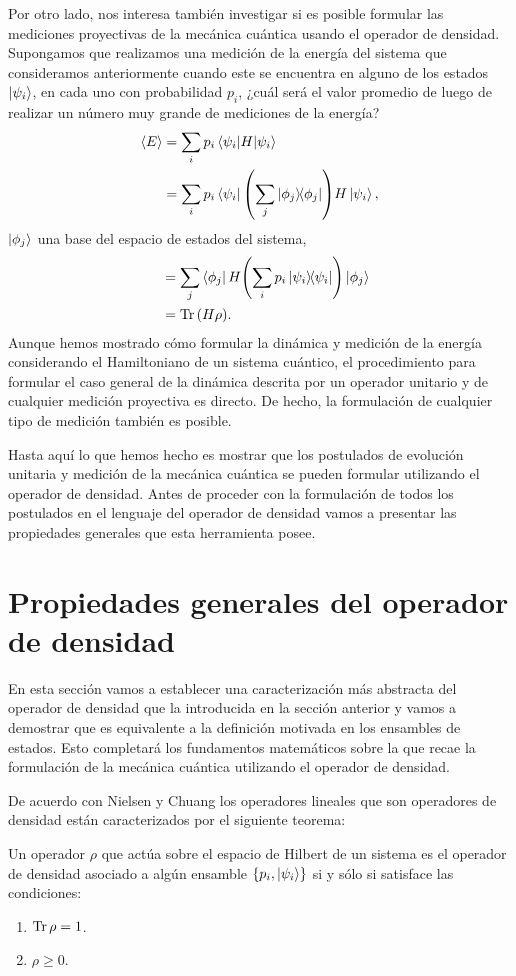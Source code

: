 Por otro lado, nos interesa también investigar si es posible formular
las mediciones proyectivas de la mecánica cuántica usando el operador de 
densidad. 
Supongamos que realizamos una medición de la energía del sistema que
consideramos anteriormente cuando este se encuentra en alguno de los 
estados $\ket{\psi_{i} }$, en cada uno con probabilidad $p_i$,
¿cuál será el valor promedio de luego de realizar un número
muy grande de mediciones de la energía?
\begin{align}
	\expval{E} &= \sum_i p_i\matrixel{\psii}{H}{\psii} \\
	&= \sum_i p_i\bra{\psii}\qty(\sum_j \dyad{\phi_j}{\phi_j})H\ket{\psii},
\end{align}
$\ket{\phi_j}$ una base  del espacio de estados del sistema,
\begin{align}
	\hspace{3mm}&= \sum_j \bra{\phi_j}H\qty(\sum_i p_i \dyad{\psii}{\psii})\ket{\phi_j} \\
	&= \Tr \qty(H\rho).
\end{align}
Aunque hemos mostrado cómo formular la dinámica y medición de la 
energía considerando el Hamiltoniano de un sistema cuántico, 
el procedimiento para formular el caso general de la dinámica
descrita por un operador unitario y de cualquier medición 
proyectiva es directo. De hecho, la formulación de cualquier tipo
de medición también es posible. 

Hasta aquí lo que hemos hecho es mostrar que los postulados de 
evolución unitaria y medición de la mecánica cuántica 
se pueden formular utilizando el operador de densidad.
Antes de proceder con la formulación de todos los postulados en el 
lenguaje del operador de densidad vamos a presentar las propiedades 
generales que esta herramienta posee. 

\section{Propiedades generales del operador de densidad} %
En esta sección vamos a establecer una caracterización 
más abstracta del operador de densidad que la introducida en 
la sección anterior y vamos a demostrar que es equivalente 
a la definición motivada en los ensambles de estados. 
Esto completará los fundamentos matemáticos
sobre la que recae la formulación de la mecánica cuántica 
utilizando el operador de densidad. 

De acuerdo con Nielsen y Chuang \cite{nielsen_chuang_2011}
los operadores lineales que son operadores de densidad están 
caracterizados por el siguiente teorema:
\begin{teorema}
Un operador $\rho$  que actúa sobre el espacio de Hilbert de un sistema 
es el operador de densidad asociado a algún ensamble 
$\{p_i, \ket{\psi _i} \}$ si y sólo si satisface las condiciones:
\begin{enumerate}
\item $\Tr \rho = 1$.
\item $\rho \geq 0$.
\end{enumerate}	
\label{teo:density-operator}
\end{teorema}

